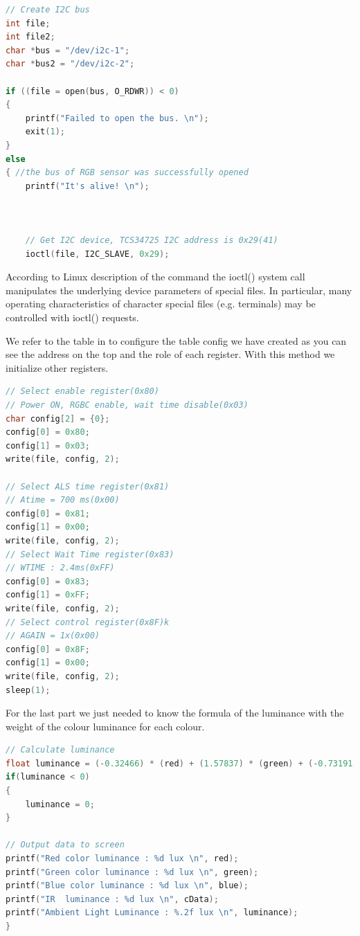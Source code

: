 \documentclass[UKenglish,10pt,a4paper]{report}
\begin{document}
\begin{lstlisting}[language=C,frame=single]
// Create I2C bus
int file;
int file2;
char *bus = "/dev/i2c-1";
char *bus2 = "/dev/i2c-2";

if ((file = open(bus, O_RDWR)) < 0)
{
	printf("Failed to open the bus. \n");
	exit(1);
}
else
{ //the bus of RGB sensor was successfully opened
	printf("It's alive! \n");
	
	
	
	// Get I2C device, TCS34725 I2C address is 0x29(41)
	ioctl(file, I2C_SLAVE, 0x29);
\end{lstlisting} 

According to Linux description of the command the ioctl() system call manipulates the underlying device parameters of special files. In particular, many operating characteristics of character special files (e.g. terminals) may be controlled with ioctl() requests.

We refer to the table in \cite{rgb} to configure the table config we have created as you can see the address on the top and the role of each register. With this method we initialize other registers.

\begin{lstlisting}[language=C,frame=single]
// Select enable register(0x80)
// Power ON, RGBC enable, wait time disable(0x03)
char config[2] = {0};
config[0] = 0x80;
config[1] = 0x03;
write(file, config, 2);

// Select ALS time register(0x81)
// Atime = 700 ms(0x00)
config[0] = 0x81;
config[1] = 0x00;
write(file, config, 2);
// Select Wait Time register(0x83)
// WTIME : 2.4ms(0xFF)
config[0] = 0x83;
config[1] = 0xFF;
write(file, config, 2);
// Select control register(0x8F)k
// AGAIN = 1x(0x00)
config[0] = 0x8F;
config[1] = 0x00;
write(file, config, 2);
sleep(1);
\end{lstlisting} 

For the last part we just needed to know the formula of the luminance with the weight of the colour luminance for each colour.

\begin{lstlisting}[language=C,frame=single]
// Calculate luminance
float luminance = (-0.32466) * (red) + (1.57837) * (green) + (-0.73191) * (blue);
if(luminance < 0)
{
	luminance = 0;
}

// Output data to screen
printf("Red color luminance : %d lux \n", red);
printf("Green color luminance : %d lux \n", green);
printf("Blue color luminance : %d lux \n", blue);
printf("IR  luminance : %d lux \n", cData);
printf("Ambient Light Luminance : %.2f lux \n", luminance);
}
\end{lstlisting} 
\end{document}
